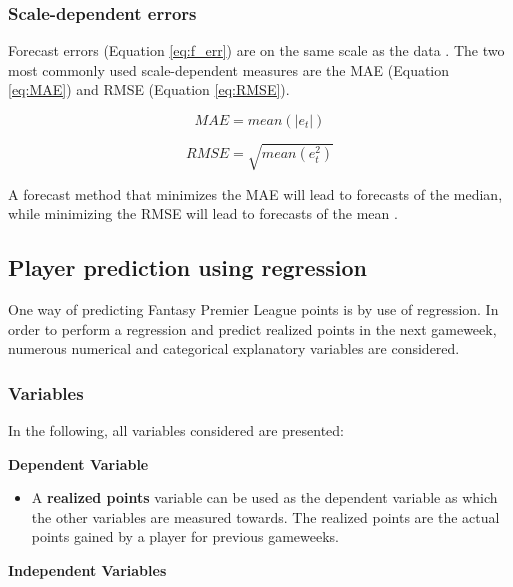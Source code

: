 \subsubsection{Scale-dependent errors}

Forecast errors (Equation \ref{eq:f_err}) are on the same scale as the data \citep{Hyndman}. The two most commonly used scale-dependent measures are the MAE (Equation \ref{eq:MAE}) and RMSE (Equation \ref{eq:RMSE}).

\begin{equation}\label{eq:MAE}
    MAE = mean(|e_t|)
\end{equation}

\begin{equation}\label{eq:RMSE}
    RMSE = \sqrt{mean(e_t^2)}
\end{equation}


 A forecast method that minimizes the MAE will lead to forecasts of the median, while minimizing the RMSE will lead to forecasts of the mean \citep{Hyndman}. 

\subsection{Player prediction using regression}

One way of predicting Fantasy Premier League points is by use of regression. In order to perform a regression and predict realized points in the next gameweek, numerous numerical and categorical explanatory variables are considered.

\subsubsection{Variables}

In the following, all variables considered are presented: 
\newpar

\textbf{Dependent Variable}
\begin{itemize}
    \item A \textbf{realized points} variable can be used as the dependent variable as which the other variables are measured towards. The realized points are the actual points gained by a player for previous gameweeks.
\end{itemize}

\textbf{Independent Variables}

